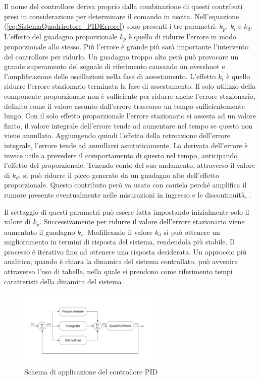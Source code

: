 Il nome del controllore deriva proprio dalla combinazione di questi contributi presi in considerazione per determinare il comando in uscita.
Nell'equazione (\ref{eq:SistemaQuadrirotore_PIDErrore}) sono presenti i tre parametri: $k_p$, $k_i$ e $k_d$.
L'effetto del guadagno proporzionale $k_p$ è quello di ridurre l'errore in modo proporzionale allo stesso. Più l'errore è grande più sarà importante l'intervento del controllore per ridurlo. Un guadagno troppo alto però può provocare un grande superamento del segnale di riferimento causando un overshoot e l'amplificazione delle oscillazioni nella fase di assestamento.
L'effetto $k_i$ è quello ridurre l'errore stazionario terminata la fase di assestamento. Il solo utilizzo della componente proporzionale non è sufficiente per ridurre anche l'errore stazionario, definito come il valore assunto dall'errore trascorso un tempo sufficientemente lungo. Con il solo effetto proporzionale l'errore stazionario si assesta ad un valore finito, il valore integrale dell'errore tende ad aumentare nel tempo se questo non viene annullato. Aggiungendo quindi l'effetto della retroazione dell'errore integrale, l'errore tende ad annullarsi asintoticamente.
La derivata dell'errore è invece utile a prevedere il comportamento di questo nel tempo, anticipando l'effetto del proporzionale. Tenendo conto del suo andamento, attraverso il valore di $k_d$, si può ridurre il picco generato da un guadagno alto dell'effetto proporzionale. Questo contributo però va usato con cautela perché amplifica il rumore presente eventualmente nelle misurazioni in ingresso e le discontinuità, \cite{advanced-pid-control}.

Il settaggio di questi parametri può essere fatta impostando inizialmente solo il valore di $k_p$. Successivamente per ridurre il valore dell'errore stazionario viene aumentato il guadagno $k_i$. Modificando il valore $k_d$ si può ottenere un miglioramento in termini di risposta del sistema, rendendola più stabile. Il processo è iterativo fino ad ottenere una risposta desiderata.
Un approccio più analitico, quando è chiara la dinamica del sistema controllato, può avvenire attraverso l'uso di tabelle, nella quale si prendono come riferimento tempi caratteristi della dinamica del sistema \cite{advanced-pid-control}.


\begin{figure}
	\centering
	\includegraphics[width=0.6\textwidth]{SistemaQuadrirotore/Figure/PID}
	\caption{Schema di applicazione del controllore PID}
\end{figure}

